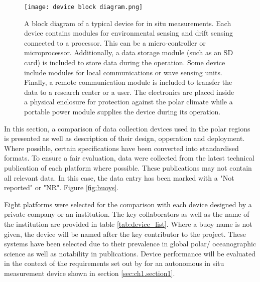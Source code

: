 \begin{figure}[H]
	\centering
	\texttt{[image: device block diagram.png]}
	\caption{A block diagram of a typical device for in situ measurements. Each device contains modules for environmental sensing and drift sensing connected to a processor. This can be a micro-controller or microprocessor. Additionally, a data storage module (such as an SD card) is included to store data during the operation. Some device include modules for local communications or wave sensing units. Finally, a remote communication module is included to transfer the data to a research center or a user. The electronics are placed inside a physical enclosure for protection against the polar climate while a portable power module supplies the device during its operation.}
	\label{fig:devblockdiag}
\end{figure}

In this section, a comparison of data collection devices used in the polar regions is presented as well as  description of their design, opperation and deployment. Where possible, certain specifications have been converted into standardised formats. To ensure a fair evaluation, data were collected from the latest technical publication of each platform where possible. These publications may not contain all relevant data. In this case, the data entry has been marked with a "Not reported" or "NR". Figure \ref{fig:buoys}.


Eight platforms were selected for the comparison with each device designed by a private company or an institution. The key collaborators as well as the name of the institution are provided in table \ref{tab:device_list}. Where a buoy name is not given, the device will be named after the key contributor to the project. These systems have been selected due to their prevalence in global polar/ oceanographic science as well as notability in publications. Device performance will be evaluated in the context of the requirements set out by \textcite{kennicutt2016delivering} for an autonomous in situ measurement device shown in section \ref{sec:ch1.section1}. 

